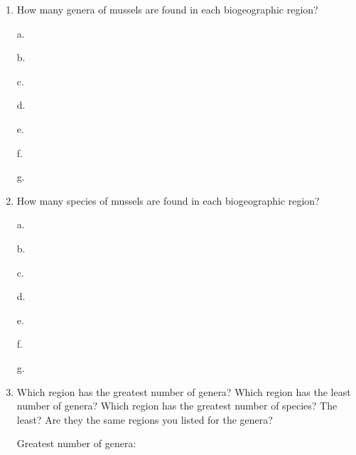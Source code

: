 \documentclass[11pt]{article}
\begin{document}
\begin{enumerate}[resume, leftmargin=*]
\item How many genera of mussels are found in each biogeographic region?

\begin{multicols}{2}
a.\vspace{0.5\baselineskip}

b.\vspace{0.5\baselineskip}

c.\vspace{0.5\baselineskip}

d.\vspace{0.5\baselineskip}

e.\vspace{0.5\baselineskip}

f.\vspace{0.5\baselineskip}

g.\vspace{0.5\baselineskip}
\end{multicols}

\item  How many species of mussels are found in each biogeographic
region?

\begin{multicols}{2}
a.\vspace{0.5\baselineskip}

b.\vspace{0.5\baselineskip}

c.\vspace{0.5\baselineskip}

d.\vspace{0.5\baselineskip}

e.\vspace{0.5\baselineskip}

f.\vspace{0.5\baselineskip}

g.\vspace{0.5\baselineskip}
\end{multicols}

\item Which region has the greatest number of genera? Which region has the
least number of genera? Which region has the greatest number of species?
The least? Are they the same regions you listed for the genera?

\begin{multicols}{2}

Greatest number of genera: \vspace{2\baselineskip}


\end{multicols}
\end{enumerate}
\end{document}
